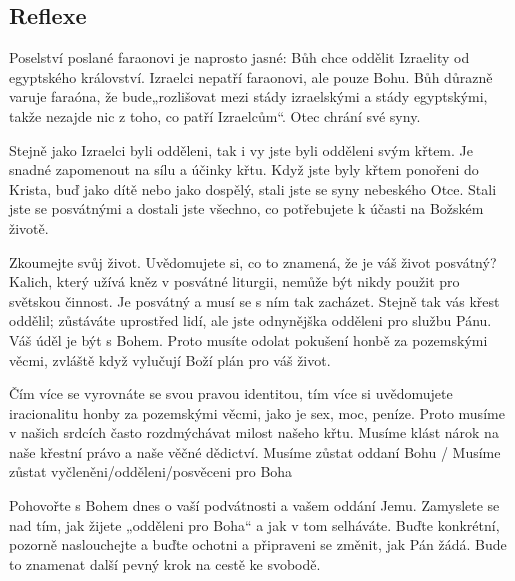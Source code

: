 \documentclass[11pt]{article}
\begin{document}
\subsection*{Reflexe}

Poselství poslané faraonovi je naprosto jasné: Bůh chce oddělit Izraelity od egyptského království. Izraelci nepatří
faraonovi, ale pouze Bohu. Bůh důrazně varuje faraóna, že bude„rozlišovat mezi stády izraelskými a stády
egyptskými, takže nezajde nic z toho, co patří Izraelcům“. Otec chrání své syny.

Stejně jako Izraelci byli odděleni, tak i vy jste byli odděleni svým křtem. Je snadné zapomenout na sílu a účinky
křtu. Když jste byly křtem ponořeni do Krista, buď jako dítě nebo jako dospělý, stali jste se syny nebeského Otce.
Stali jste se posvátnými a dostali jste všechno, co potřebujete k účasti na Božském životě.

Zkoumejte svůj život. Uvědomujete si, co to znamená, že je váš život posvátný? Kalich, který užívá kněz v
posvátné liturgii, nemůže být nikdy použit pro světskou činnost. Je posvátný a musí se s ním tak zacházet. Stejně
tak vás křest oddělil; zůstáváte uprostřed lidí, ale jste odnynějška odděleni pro službu Pánu. Váš úděl je být s
Bohem. Proto musíte odolat pokušení honbě za pozemskými věcmi, zvláště když vylučují Boží plán pro váš život.

Čím více se vyrovnáte se svou pravou identitou, tím více si uvědomujete iracionalitu honby za pozemskými věcmi,
jako je sex, moc, peníze. Proto musíme v našich srdcích často rozdmýchávat milost našeho křtu. Musíme klást
nárok na naše křestní právo a naše věčné dědictví. Musíme zůstat oddaní Bohu / Musíme zůstat
vyčleněni/odděleni/posvěceni pro Boha

Pohovořte s Bohem dnes o vaší podvátnosti a vašem oddání Jemu. Zamyslete se nad tím, jak žijete „odděleni pro
Boha“ a jak v tom selháváte. Buďte konkrétní, pozorně naslouchejte a buďte ochotni a připraveni se změnit, jak
Pán žádá. Bude to znamenat další pevný krok na cestě ke svobodě.
\end{document}
